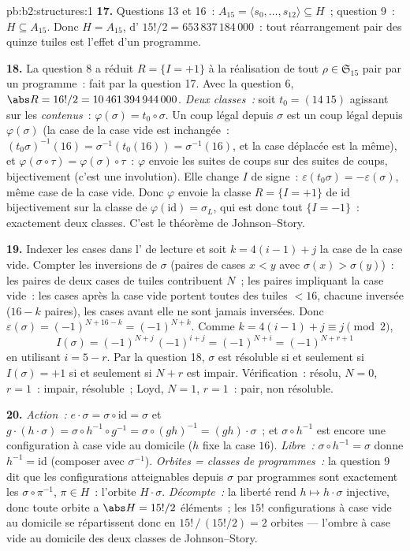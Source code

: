 \begin{solution}{pb:b2:structures:1}
\textbf{17.} Questions 13 et 16~: $A_{15} = \langle s_0, \dots,
s_{12}\rangle \subseteq H$~; question 9~: $H \subseteq A_{15}$. Donc
$H = A_{15}$, d' $15!/2 = 653\,837\,184\,000$~: tout
réarrangement pair des quinze tuiles est l'effet d'un programme.

\textbf{18.} La question 8 a réduit $R = \{I = +1\}$ à la
réalisation de tout $\rho \in \mathfrak{S}_{15}$ pair par un
programme~: fait par la question 17. Avec la question 6, $\abs R =
16!/2 = 10\,461\,394\,944\,000$. \emph{Deux classes~:} soit $t_0 =
(14\ 15)$ agissant sur les \emph{contenus}~: $\varphi(\sigma) = t_0
\circ \sigma$. Un coup légal depuis $\sigma$ est un coup légal depuis
$\varphi(\sigma)$ (la case de la case vide est inchangée~:
$(t_0\sigma)^{-1}(16) = \sigma^{-1}(t_0(16)) = \sigma^{-1}(16)$,
et la case déplacée est la même), et $\varphi(\sigma \circ \tau)
= \varphi(\sigma) \circ \tau$~: $\varphi$ envoie les suites de coups
sur des suites de coups, bijectivement (c'est une involution). Elle
change $I$ de signe~: $\varepsilon(t_0\sigma) = -\varepsilon(\sigma)$,
même case de la case vide. Donc $\varphi$ envoie la classe $R = \{I =
+1\}$ de $\mathrm{id}$ bijectivement sur la classe de
$\varphi(\mathrm{id}) = \sigma_L$, qui est donc tout $\{I = -1\}$~:
exactement deux classes. C'est le théorème de Johnson--Story.

\textbf{19.} Indexer les cases dans l' de lecture et soit $k =
4(i - 1) + j$ la case de la case vide. Compter les inversions de
$\sigma$ (paires de cases $x < y$ avec $\sigma(x) > \sigma(y)$)~:
les paires de deux cases de tuiles contribuent $N$~; les paires
impliquant la case vide~: les cases après la case vide portent toutes
des tuiles $< 16$, chacune inversée ($16 - k$ paires), les cases
avant elle ne sont jamais inversées. Donc
$\varepsilon(\sigma) = (-1)^{N + 16 - k} = (-1)^{N + k}$. Comme
$k = 4(i-1) + j \equiv j \pmod 2$,
\[
I(\sigma) = (-1)^{N + j}\,(-1)^{i + j} = (-1)^{N + i}
= (-1)^{N + r + 1}
\]
en utilisant $i = 5 - r$. Par la question 18, $\sigma$ est résoluble
si et seulement si $I(\sigma) = +1$ si et seulement si $N + r$ est
impair. Vérification~: résolu, $N = 0$, $r = 1$~: impair, résoluble~;
Loyd, $N = 1$, $r = 1$~: pair, non résoluble.

\textbf{20.} \emph{Action~:} $e \cdot \sigma = \sigma \circ
\mathrm{id} = \sigma$ et $g \cdot (h \cdot \sigma) = \sigma
\circ h^{-1} \circ g^{-1} = \sigma \circ (gh)^{-1} = (gh) \cdot
\sigma$~; et $\sigma \circ h^{-1}$ est encore une configuration à
case vide au domicile ($h$ fixe la case $16$). \emph{Libre~:} $\sigma
\circ h^{-1} = \sigma$ donne $h^{-1} = \mathrm{id}$ (composer avec
$\sigma^{-1}$). \emph{Orbites = classes de programmes~:} la question
9 dit que les configurations atteignables depuis $\sigma$ par
programmes sont exactement les $\sigma \circ \pi^{-1}$, $\pi \in H$~:
l'orbite $H \cdot \sigma$. \emph{Décompte~:} la liberté rend $h
\mapsto h \cdot \sigma$ injective, donc toute orbite a $\abs H =
15!/2$ éléments~; les $15!$ configurations à case vide au domicile se
répartissent donc en $15!\,/\,(15!/2) = 2$ orbites --- l'ombre à case
vide au domicile des deux classes de Johnson--Story.


\end{solution}
